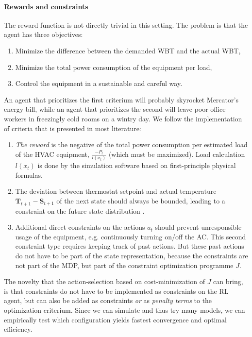 \documentclass{article}
\theoremstyle{definition}
\theoremstyle{remark}
\begin{document}
\paragraph{Rewards and constraints} \label{constraints}
The reward function is not directly trivial in this setting. The problem is that the agent has three objectives:
\begin{enumerate}
    \item Minimize the difference between the demanded WBT and the actual WBT,
    \item Minimize the total power consumption of the equipment per load,
    \item Control the equipment in a sustainable and careful way.
\end{enumerate}
An agent that prioritizes the first criterium will probably skyrocket Mercator's energy bill, while an agent that prioritizes the second will leave poor office workers in freezingly cold rooms on a wintry day. We follow the implementation of criteria that is presented in most literature: 
\begin{enumerate}
    \item \textit{The reward} is the negative of the total power consumption per estimated load of the HVAC equipment, $\frac{-P_t}{l(x_t)}$ (which must be maximized). Load calculation $l(x_t)$ is done by the simulation software based on first-principle physical formulas.
    \item  The deviation between thermostat setpoint and actual temperature $\mathbf{T}_{t+1}-\mathbf{S}_{t+1}$ of the next state should always be bounded, leading to a constraint on the future state distribution \cite{gamble_gao_2018, evans_gao_2016, luo2022controlling}. 
    \item Additional direct constraints on the actions $a_t$ should prevent unresponsible usage of the equipment, e.g. continuously turning on/off the AC. This second constraint type requires keeping track of past actions. But these past actions do not have to be part of the state representation, because the constraints are not part of the MDP, but part of the constraint optimization programme $J$. 
\end{enumerate}
    The novelty that the action-selection based on cost-minimization of $J$ can bring, is that constraints do not have to be implemented as constraints on the RL agent, but can also be added as constraints \textit{or} as \textit{penalty terms} to the optimization criterium. Since we can simulate and thus try many models, we can empirically test which configuration yields fastest convergence and optimal efficiency.
\end{document}
